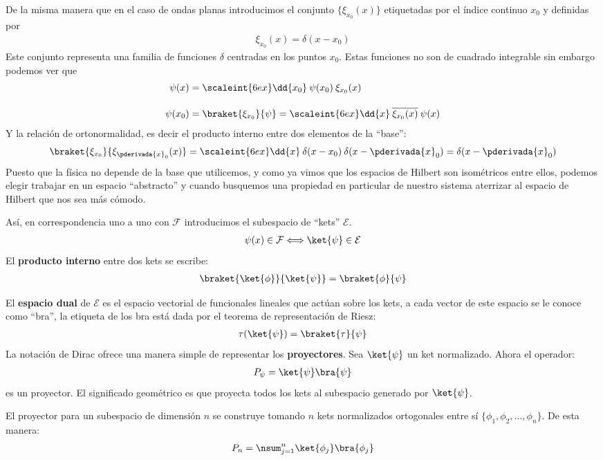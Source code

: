 De la misma manera que en el caso de ondas planas introducimos el conjunto $\{\xi_{x_{0}} (x) \}$ etiquetadas por el índice continuo $x_{0}$ y definidas por
\begin{align*} \xi_{x_{0}} (x) = \delta (x - x_{0})\end{align*}
Este conjunto representa una familia de funciones $\delta$ centradas en los puntos $x_{0}$. Estas funciones no son de cuadrado integrable sin embargo podemos ver que
\begin{align*}
\psi (x) &= \scaleint{6ex} \dd{x_{0}} \: \psi(x_{0}) \: \xi_{x_{0}} (x) \\[1em]
\psi (x_{0}) &= \braket{\xi_{x_{0}}}{\psi} = \scaleint{6ex} \dd{x} \: \overline{\xi_{x_{0}}(x)} \: \psi(x)
\end{align*}
Y la relación de ortonormalidad, es decir el producto interno entre dos elementos de la \enquote{base}:
\begin{align*}
\braket{\xi_{x_{0}}}{\xi_{\pderivada{x}_{0}}(x)} = \scaleint{6ex} \dd{x} \: \delta (x - x_{0}) \: \delta (x - \pderivada{x}_{0}) = \delta (x - \pderivada{x}_{0})
\end{align*}
Puesto que la física no depende de la base que utilicemos, y como ya vimos que los espacios de Hilbert son isométricos entre ellos, podemos elegir trabajar en un espacio \enquote{abstracto} y cuando busquemos una propiedad en particular de nuestro sistema aterrizar al espacio de Hilbert que nos sea más cómodo. 
\par
Así, en correspondencia uno a uno con $\mathcal{F}$ introducimos el subespacio de \enquote{kets} $\mathcal{E}$.
\begin{align*}
\psi (x) \in \mathcal{F} \Longleftrightarrow \ket{\psi} \in \mathcal{E}
\end{align*}
El \textbf{producto interno} entre dos kets se escribe:
\begin{align*}
\braket{\ket{\phi}}{\ket{\psi}} = \braket{\phi}{\psi}
\end{align*}

El \textbf{espacio dual} de $\mathcal{E}$ es el espacio vectorial de funcionales lineales que actúan sobre los kets, a cada vector de este espacio se le conoce como \enquote{bra}, la etiqueta de los bra está dada por el teorema de representación de Riesz:
\begin{align*}
\tau (\ket{\psi}) = \braket{\tau}{\psi}
\end{align*}
La notación de Dirac ofrece una manera simple de representar los \textbf{proyectores}. Sea $\ket{\psi}$ un ket normalizado. Ahora el operador:
\begin{align*}
P_{\psi} =  \ket{\psi} \bra{\psi}
\end{align*}
es un proyector. El significado geométrico es que proyecta todos los kets al subespacio generado por $\ket{\psi}$.
\par
El proyector para un subespacio de dimensión $n$ se construye tomando $n$ kets normalizados ortogonales entre sí $\{ \phi_{1}, \phi_{2}, \ldots, \phi_{n} \}$. De esta manera:
\begin{align*}
P_{n} = \nsum_{j=1}^{n} \ket{\phi_{j}} \bra{\phi_{j}}
\end{align*}

